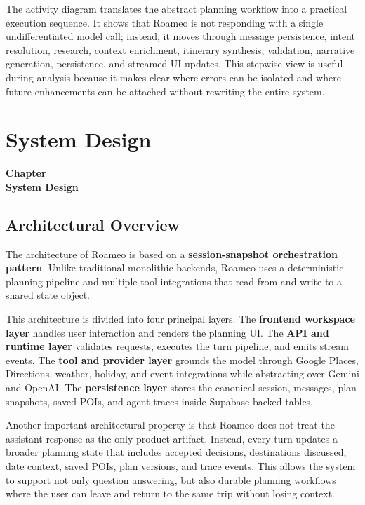 \documentclass[12pt,a4paper]{report}
\newcommand{\chaptercontentheading}[1]{%
  \thispagestyle{mainstyle}%
  \begin{center}
    {\Large\bfseries Chapter~\thechapter}\\[0.35cm]
    {\Large\bfseries #1}
  \end{center}
  \vspace{0.9cm}
}
\begin{document}
The activity diagram translates the abstract planning workflow into a practical execution sequence. It shows that Roameo is not responding with a single undifferentiated model call; instead, it moves through message persistence, intent resolution, research, context enrichment, itinerary synthesis, validation, narrative generation, persistence, and streamed UI updates. This stepwise view is useful during analysis because it makes clear where errors can be isolated and where future enhancements can be attached without rewriting the entire system.

\chapter{System Design}
\chaptercontentheading{System Design}

\section{Architectural Overview}

The architecture of Roameo is based on a \textbf{session-snapshot orchestration pattern}. Unlike traditional monolithic backends, Roameo uses a deterministic planning pipeline and multiple tool integrations that read from and write to a shared state object.

This architecture is divided into four principal layers. The \textbf{frontend workspace layer} handles user interaction and renders the planning UI. The \textbf{API and runtime layer} validates requests, executes the turn pipeline, and emits stream events. The \textbf{tool and provider layer} grounds the model through Google Places, Directions, weather, holiday, and event integrations while abstracting over Gemini and OpenAI. The \textbf{persistence layer} stores the canonical session, messages, plan snapshots, saved POIs, and agent traces inside Supabase-backed tables.

Another important architectural property is that Roameo does not treat the assistant response as the only product artifact. Instead, every turn updates a broader planning state that includes accepted decisions, destinations discussed, date context, saved POIs, plan versions, and trace events. This allows the system to support not only question answering, but also durable planning workflows where the user can leave and return to the same trip without losing context.
\end{document}
